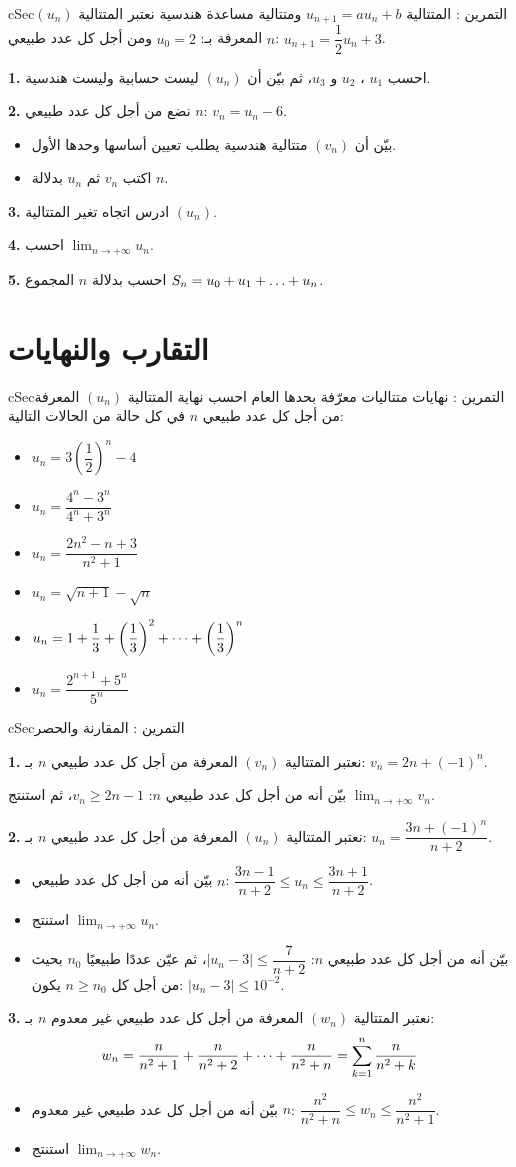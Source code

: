 \documentclass[12pt,a4paper]{article}
\newenvironment{BOX}[2]{\begin{otherlanguage}{english}\begin{arbox}{#1}{#2}}{\end{arbox}\end{otherlanguage}}
\newcounter{exo}
\newenvironment{tamrin}[1]{\stepcounter{exo}\begin{BOX}{cSec}{التمرين \theexo: #1}}{\end{BOX}}
\renewcommand{\dots}{\mathinner{\ldotp\ldotp\ldotp}}
\renewcommand{\cdots}{\mathinner{\cdotp\cdotp\cdotp}}
\newcommand{\limn}{\displaystyle\lim_{n\to+\infty}}
\newenvironment{sq}{\begin{itemize}[leftmargin=2.4em,itemsep=3pt]}{\end{itemize}}
\newcommand{\qa}{\item[(أ)]}\newcommand{\qb}{\item[(ب)]}\newcommand{\qc}{\item[(جـ)]}\newcommand{\qd}{\item[(د)]}\newcommand{\qe}{\item[(هـ)]}
\newcommand{\QQ}[1]{\par\smallskip\textbf{#1.} }
\begin{document}
\begin{tamrin}{المتتالية $u_{n+1}=au_n+b$ ومتتالية مساعدة هندسية}
نعتبر المتتالية $(u_n)$ المعرفة بـ: $u_0=2$ ومن أجل كل عدد طبيعي $n$: $u_{n+1}=\dfrac12u_n+3$.
\QQ{1} احسب $u_1$ ، $u_2$ و $u_3$، ثم بيّن أن $(u_n)$ ليست حسابية وليست هندسية.
\QQ{2} نضع من أجل كل عدد طبيعي $n$: $v_n=u_n-6$.
\begin{sq}
\qa بيّن أن $(v_n)$ متتالية هندسية يطلب تعيين أساسها وحدها الأول.
\qb اكتب $v_n$ ثم $u_n$ بدلالة $n$.
\end{sq}
\QQ{3} ادرس اتجاه تغير المتتالية $(u_n)$.
\QQ{4} احسب $\limn u_n$.
\QQ{5} احسب بدلالة $n$ المجموع $S_n=u_0+u_1+\dots+u_n$.
\end{tamrin}

\section{التقارب والنهايات}

\begin{tamrin}{نهايات متتاليات معرّفة بحدها العام}
احسب نهاية المتتالية $(u_n)$ المعرفة من أجل كل عدد طبيعي $n$ في كل حالة من الحالات التالية:
\begin{sq}
\qa $u_n=3\left(\dfrac12\right)^n-4$
\qb $u_n=\dfrac{4^n-3^n}{4^n+3^n}$
\qc $u_n=\dfrac{2n^2-n+3}{n^2+1}$
\qd $u_n=\sqrt{n+1}-\sqrt{n}$
\qe $u_n=1+\dfrac13+\left(\dfrac13\right)^2+\cdots+\left(\dfrac13\right)^n$
\item[(و)] $u_n=\dfrac{2^{n+1}+5^n}{5^n}$
\end{sq}
\end{tamrin}

\begin{tamrin}{المقارنة والحصر}
\QQ{1} نعتبر المتتالية $(v_n)$ المعرفة من أجل كل عدد طبيعي $n$ بـ: $v_n=2n+(-1)^n$.

بيّن أنه من أجل كل عدد طبيعي $n$: $v_n\geqslant 2n-1$، ثم استنتج $\limn v_n$.
\QQ{2} نعتبر المتتالية $(u_n)$ المعرفة من أجل كل عدد طبيعي $n$ بـ: $u_n=\dfrac{3n+(-1)^n}{n+2}$.
\begin{sq}
\qa بيّن أنه من أجل كل عدد طبيعي $n$: $\dfrac{3n-1}{n+2}\leqslant u_n\leqslant\dfrac{3n+1}{n+2}$.
\qb استنتج $\limn u_n$.
\qc بيّن أنه من أجل كل عدد طبيعي $n$: $\left|u_n-3\right|\leqslant\dfrac{7}{n+2}$، ثم عيّن عددًا طبيعيًا $n_0$ بحيث من أجل كل $n\geqslant n_0$ يكون: $\left|u_n-3\right|\leqslant10^{-2}$.
\end{sq}
\QQ{3} نعتبر المتتالية $(w_n)$ المعرفة من أجل كل عدد طبيعي غير معدوم $n$ بـ:
\[w_n=\frac{n}{n^2+1}+\frac{n}{n^2+2}+\cdots+\frac{n}{n^2+n}=\sum_{k=1}^{n}\frac{n}{n^2+k}\]
\begin{sq}
\qa بيّن أنه من أجل كل عدد طبيعي غير معدوم $n$: $\dfrac{n^2}{n^2+n}\leqslant w_n\leqslant\dfrac{n^2}{n^2+1}$.
\qb استنتج $\limn w_n$.
\end{sq}
\end{tamrin}
\end{document}
